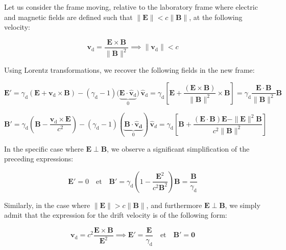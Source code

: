 Let us consider the frame moving, relative to the laboratory frame where electric and magnetic fields are defined such that $\|\mathbf{E}\|<c\|\mathbf{B}\|$, at the following velocity:

\begin{equation}
    \mathbf{v}_\mathrm{d}=\frac{\mathbf{E}\times\mathbf{B}}{\|\mathbf{B}\|^2}\implies\|\mathbf{v}_\mathrm{d}\|<c
\end{equation}

Using Lorentz transformations, we recover the following fields in the new frame:

\begin{equation}
    \mathbf{E}'=\gamma_\mathrm{d}\left(\mathbf{E}+\mathbf{v}_\mathrm{d}\times\mathbf{B}\right)-(\gamma_\mathrm{d}-1)\big(\underbrace{\mathbf{E}\cdot\mathbf{\hat{v}}_\mathrm{d}}_{0}\big)\,\mathbf{\hat{v}}_\mathrm{d}=\gamma_\mathrm{d}\left[\mathbf{E}+\frac{(\mathbf{E}\times\mathbf{B})}{\|\mathbf{B}\|^2}\times\mathbf{B}\right]=\gamma_\mathrm{d}\frac{\mathbf{E}\cdot\mathbf{B}}{\|\mathbf{B}\|^2}\mathbf{B}
\end{equation}

\begin{equation}
    \mathbf{B}'=\gamma_\mathrm{d}\left(\mathbf{B}-\frac{\mathbf{v}_\mathrm{d}\times\mathbf{E}}{c^2}\right)-(\gamma_\mathrm{d}-1)(\underbrace{\mathbf{B}\cdot\mathbf{\hat{v}_d}}_0)\,\mathbf{\hat{v}}_d=\gamma_\mathrm{d}\left[\mathbf{B}+\frac{(\mathbf{E}\cdot\mathbf{B})\mathbf{E}-\|\mathbf{E}\|^2\mathbf{B}}{c^2\|\mathbf{B}\|^2}\right]
\end{equation}

In the specific case where $\mathbf{E}\perp\mathbf{B}$, we observe a significant simplification of the preceding expressions:

\begin{equation}
    \mathbf{E}'=0\quad\text{et}\quad\mathbf{B}'=\gamma_\mathrm{d}\left(1-\frac{\mathbf{E}^2}{c^2\mathbf{B}^2}\right)\mathbf{B}=\frac{\mathbf{B}}{\gamma_\mathrm{d}}
\end{equation}

Similarly, in the case where $\|\mathbf{E}\|>c\|\mathbf{B}\|$, and furthermore $\mathbf{E}\perp\mathbf{B}$, we simply admit that the expression for the drift velocity is of the following form:

\begin{equation}
    \mathbf{v}_\mathrm{d}=c^2\frac{\mathbf{E}\times\mathbf{B}}{\mathbf{E}^2}\implies\mathbf{E}'=\frac{\mathbf{E}}{\gamma_\mathrm{d}}\quad\text{et}\quad\mathbf{B}'=\mathbf{0}
\end{equation}

